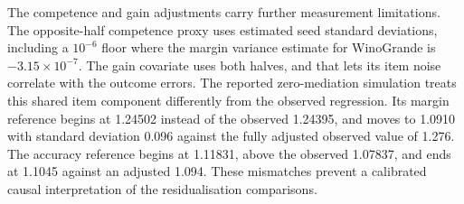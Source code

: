 The competence and gain adjustments carry further measurement limitations. The opposite-half competence proxy uses estimated seed standard deviations, including a $10^{-6}$ floor where the margin variance estimate for WinoGrande is $-3.15\times10^{-7}$. The gain covariate uses both halves, and that lets its item noise correlate with the outcome errors. The reported zero-mediation simulation treats this shared item component differently from the observed regression. Its margin reference begins at 1.24502 instead of the observed 1.24395, and moves to 1.0910 with standard deviation 0.096 against the fully adjusted observed value of 1.276. The accuracy reference begins at 1.11831, above the observed 1.07837, and ends at 1.1045 against an adjusted 1.094. These mismatches prevent a calibrated causal interpretation of the residualisation comparisons.